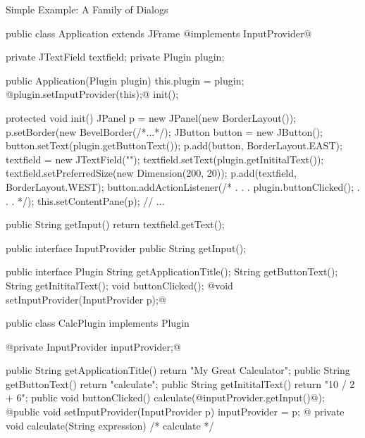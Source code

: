 \begin{frame}[fragile]{Simple Example: A Family of Dialogs}
	\tiny\begin{mycolumns}[columns=2,widths={50,50}]
\begin{codetight}{}
public class Application extends JFrame @implements InputProvider@ {
	private JTextField textfield;
	private Plugin plugin;

	public Application(Plugin plugin) {
		this.plugin = plugin;
		@plugin.setInputProvider(this);@
		init();
	}

	protected void init() {
		JPanel p = new JPanel(new BorderLayout());
		p.setBorder(new BevelBorder(/*...*/);
		JButton button = new JButton();
		button.setText(plugin.getButtonText());
		p.add(button, BorderLayout.EAST);
		textfield = new JTextField("");
		textfield.setText(plugin.getInititalText());
		textfield.setPreferredSize(new Dimension(200, 20));
		p.add(textfield, BorderLayout.WEST);		
		button.addActionListener(/* . . . plugin.buttonClicked(); . . . */);
		this.setContentPane(p);
		// ...
	}

	public String getInput() {
		return textfield.getText();
	}
}
\end{codetight}
		\mynextcolumn
\begin{codetight}{}
public interface InputProvider {
	public String getInput();
}
\end{codetight}
\begin{codetight}{}
public interface Plugin {
	String getApplicationTitle();
	String getButtonText();
	String getInititalText();
	void buttonClicked();
	@void setInputProvider(InputProvider p);@
}
\end{codetight}
\begin{codetight}{}
public class CalcPlugin implements Plugin {
	@private InputProvider inputProvider;@

	public String getApplicationTitle() {
		return "My Great Calculator";
	}
	public String getButtonText() {
		return "calculate";
	}
	public String getInititalText() {
		return "10 / 2 + 6";
	}
	public void buttonClicked() {
		calculate(@inputProvider.getInput()@);
	}
	@public void setInputProvider(InputProvider p) {
		inputProvider = p;
	}@
	private void calculate(String expression) {
		/* calculate */
	}
}
\end{codetight}
	\end{mycolumns}
\end{frame}

